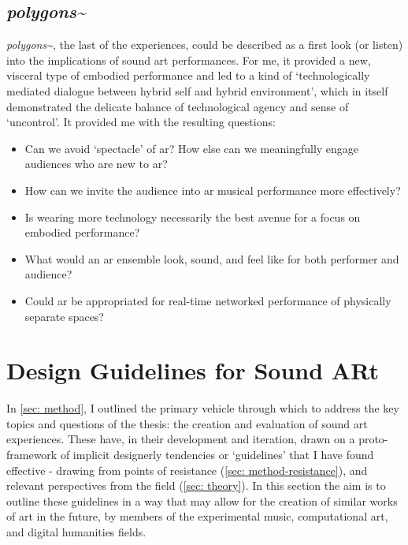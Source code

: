 \subsection{\textit{polygons\textasciitilde{}}}
\textit{polygons\textasciitilde{}}, the last of the experiences, could be described as a first look (or listen) into the implications of sound \gls{art} performances. For me, it provided a new, visceral type of embodied performance and led to a kind of `technologically mediated dialogue between hybrid self and hybrid environment', which in itself demonstrated the delicate balance of technological agency and sense of `uncontrol'. It provided me with the resulting questions: 
\begin{itemize}
    \item Can we avoid `spectacle' of \gls{ar}? How else can we meaningfully engage audiences who are new to \gls{ar}?
    \item How can we invite the audience into \gls{ar} musical performance more effectively?
    \item Is wearing more technology necessarily the best avenue for a focus on embodied performance?
    \item What would an \gls{ar} ensemble look, sound, and feel like for both performer and audience?
    \item Could \gls{ar} be appropriated for real-time networked performance of physically separate spaces?
\end{itemize}

\section{Design Guidelines for Sound ARt}\label{sec: discussion-guidelines}
In \autoref{sec: method}, I outlined the primary vehicle through which to address the key topics and questions of the thesis: the creation and evaluation of sound \gls{art} experiences. These have, in their development and iteration, drawn on a proto-framework of implicit designerly tendencies or `guidelines' that I have found effective - drawing from points of resistance (\autoref{sec: method-resistance}), and relevant perspectives from the field (\autoref{sec: theory}). In this section the aim is to outline these guidelines in a way that may allow for the creation of similar works of \gls{art} in the future, by members of the experimental music, computational art, and digital humanities fields. 

